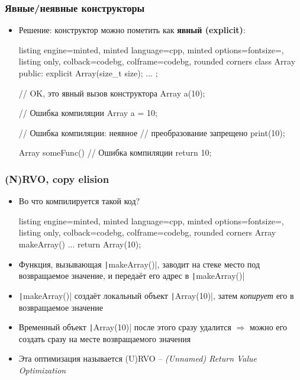 \documentclass[10pt]{beamer}
\begin{document}
\begin{frame}[fragile]
\frametitle{Явные/неявные конструкторы}
\begin{itemize}
\item Решение: конструктор можно пометить как \textbf{явный (explicit)}:
\begin{tcblisting}{listing engine=minted, minted language=cpp, minted options={fontsize=\scriptsize}, listing only, colback=codebg, colframe=codebg, rounded corners}
class Array {
public:
  explicit Array(size_t size);
  ...
};

// OK, это явный вызов конструктора
Array a(10);

// Ошибка компиляции
Array a = 10;

// Ошибка компиляции: неявное
// преобразование запрещено
print(10);

Array someFunc() {
  // Ошибка компиляции
  return 10;
}
\end{tcblisting}
\end{itemize}
\end{frame}

\begin{frame}[fragile]
\frametitle{(N)RVO, copy elision}
\begin{itemize}
\item Во что компилируется такой код?
\begin{tcblisting}{listing engine=minted, minted language=cpp, minted options={fontsize=\scriptsize}, listing only, colback=codebg, colframe=codebg, rounded corners}
Array makeArray() {
  ...
  return Array(10);
}
\end{tcblisting}
\pause
{}
\item Функция, вызывающая \texttt|makeArray()|, заводит на стеке место под возвращаемое значение, и передаёт его адрес в \texttt|makeArray()|
\item \texttt|makeArray()| создаёт локальный объект \texttt|Array(10)|, затем \textit{копирует} его в возвращаемое значение
\pause
\item Временный объект \texttt|Array(10)| после этого сразу удалится \(\Longrightarrow\) можно его создать сразу на месте возвращаемого значения
\pause
\item Эта оптимизация называется (U)RVO -- \textit{(Unnamed) Return Value Optimization}
\end{itemize}
\end{frame}
\end{document}
